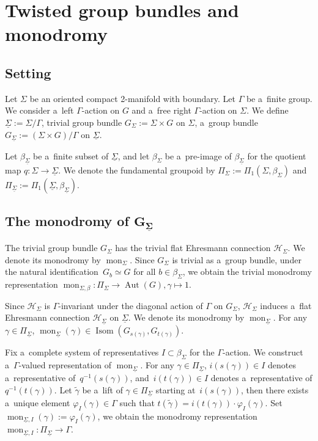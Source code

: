 \documentclass[pdftex]{sigma}
\numberwithin{equation}{section}
\theoremstyle{definition}
\newcommand{\Aut}{\operatorname{Aut}}
\newcommand{\Isom}{\operatorname{Isom}}
\newcommand{\mon}{\operatorname{mon}}
\begin{document}
\section{Twisted group bundles and monodromy}\label{Appendix B}

\subsection{Setting}

Let $\Sigma$ be an oriented compact 2-manifold with boundary.
Let $\Gamma$ be a~finite group.
We consider a~left $\Gamma$-action on $G$ and a~free right $\Gamma$-action on $\Sigma$.
We define
 $ \underline{\Sigma} := \Sigma/\Gamma$,
 trivial group bundle $G_{\Sigma} := \Sigma \times G$ on $\Sigma$,
a~group bundle $G_{\underline{\Sigma}}:= (\Sigma \times G)/\Gamma$ on $\underline{\Sigma}$.

Let $\beta_{\underline{\Sigma}} $ be a~finite subset of $\underline{\Sigma}$, and let $\beta_{\Sigma}$ be a~pre-image of $\beta_{\underline{\Sigma}}$ for the quotient map $q \colon \Sigma \to \underline{\Sigma}$.
We denote the fundamental groupoid by $\Pi_{\Sigma} := \Pi_1(\Sigma,\beta_{\Sigma})$ and $\Pi_{\underline{\Sigma}} := \Pi_1(\underline{\Sigma},\beta_{\underline{\Sigma}})$.

\subsection[The monodromy of G\_Sigma]{The monodromy of $\boldsymbol{G_{\underline{\Sigma}}}$}
The trivial group bundle $G_{\Sigma}$ has the trivial flat Ehresmann connection $\mathcal{H}_{\Sigma}$. We denote its monodromy by $\mon_{\Sigma}$.
Since $G_{\Sigma}$ is trivial as a~group bundle, under the natural identification~${G_b \simeq G}$ for all $b \in \beta_{\Sigma}$, we obtain the trivial monodromy representation
$
\mon_{\Sigma, \beta} \colon\Pi_{\Sigma} \to \Aut(G), \gamma \mapsto 1$.

Since $\mathcal{H}_{\Sigma}$ is $\Gamma$-invariant under the diagonal action of $\Gamma$ on $G_{\Sigma}$, $\mathcal{H}_{\Sigma}$ induces a~flat Ehresmann connection $\mathcal{H}_{\underline{\Sigma}}$ on $\underline{\Sigma}$.
We denote its monodromy by $\mon_{\underline{\Sigma}}$.
For any $\gamma \in \Pi_{\underline{\Sigma}}$, $\mon_{\underline{\Sigma}}(\gamma) \in \Isom(G_{s(\gamma)},G_{t(\gamma)})$.

Fix a~complete system of representatives $I \subset \beta_{\Sigma}$ for the $\Gamma$-action.
We construct a~$\Gamma$-valued representation of $\mon_{\underline{\Sigma}}$.
For any $\gamma \in \Pi_{\underline{\Sigma}}$, $i(s(\gamma)) \in I$ denotes a~representative of~$q^{-1}(s(\gamma))$, and~${i(t(\gamma)) \in I}$ denotes a~representative of $q^{-1}(t(\gamma))$.
Let $\tilde{\gamma}$ be a~lift of $\gamma \in \Pi_{\underline{\Sigma}}$ starting at~$i(s(\gamma))$,
then there exists a~unique element $\varphi_I(\gamma) \in \Gamma$ such that
$t(\tilde{\gamma}) = i(t(\gamma))\cdot \varphi_I(\gamma)$.
Set ${\mon_{\underline{\Sigma},I}(\gamma) := \varphi_I(\gamma)}$,
we obtain the monodromy representation $\mon_{\underline{\Sigma},I} \colon \Pi_{\underline{\Sigma}} \to \Gamma$.
\end{document}
